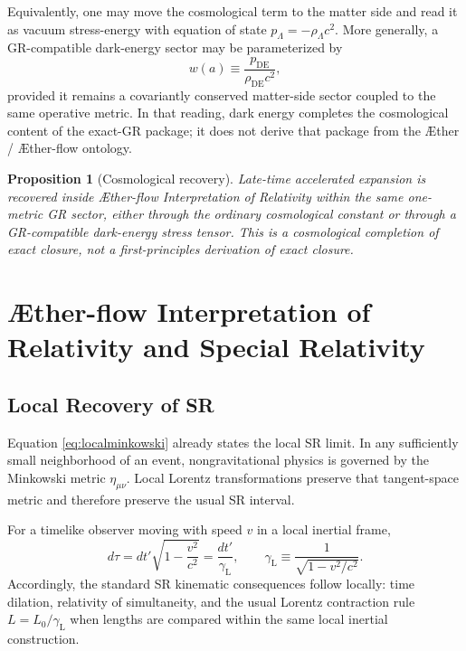 \documentclass[11pt]{article}
\newcommand{\Aether}{\AE{}ther}
\newcommand{\Aflow}{\AE{}ther-flow}
\newcommand{\TheoryName}{\Aflow{} Interpretation of Relativity}
\newcommand{\Lor}{\gamma_{\mathrm{L}}}
\newtheorem{proposition}{Proposition}
\begin{document}
Equivalently, one may move the cosmological term to the matter side and read it as vacuum stress-energy with equation of state \(p_{\Lambda}=-\rho_{\Lambda}c^2\). More generally, a GR-compatible dark-energy sector may be parameterized by
\begin{equation}
w(a)\equiv \frac{p_{\mathrm{DE}}}{\rho_{\mathrm{DE}}c^2},
\label{eq:wa}
\end{equation}
provided it remains a covariantly conserved matter-side sector coupled to the same operative metric. In that reading, dark energy completes the cosmological content of the exact-GR package; it does not derive that package from the \Aether{} / \Aflow{} ontology.

\begin{proposition}[Cosmological recovery]
Late-time accelerated expansion is recovered inside \TheoryName{} within the same one-metric GR sector, either through the ordinary cosmological constant or through a GR-compatible dark-energy stress tensor. This is a cosmological completion of exact closure, not a first-principles derivation of exact closure.
\end{proposition}

\section{\TheoryName{} and Special Relativity}

\subsection{Local Recovery of SR}

Equation \eqref{eq:localminkowski} already states the local SR limit. In any sufficiently small neighborhood of an event, nongravitational physics is governed by the Minkowski metric \(\eta_{\mu\nu}\). Local Lorentz transformations preserve that tangent-space metric and therefore preserve the usual SR interval.

For a timelike observer moving with speed \(v\) in a local inertial frame,
\begin{equation}
d\tau
=
dt'\sqrt{1-\frac{v^2}{c^2}}
=
\frac{dt'}{\Lor},
\qquad
\Lor\equiv \frac{1}{\sqrt{1-v^2/c^2}}.
\label{eq:kinematictimedilation}
\end{equation}
Accordingly, the standard SR kinematic consequences follow locally: time dilation, relativity of simultaneity, and the usual Lorentz contraction rule \(L=L_0/\Lor\) when lengths are compared within the same local inertial construction.
\end{document}
